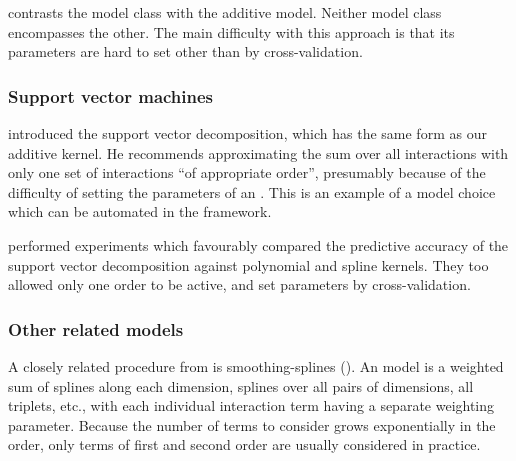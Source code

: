  contrasts the \HKL{} model class with the additive \gp{} model.
Neither model class encompasses the other.
The main difficulty with this approach is that its parameters are hard to set other than by cross-validation.



\subsubsection{Support vector machines}

\citet{vapnik1998statistical} introduced the support vector \ANOVA{} decomposition, which has the same form as our additive kernel.
He recommends approximating the sum over all interactions with only one set of interactions ``of appropriate order'', presumably because of the difficulty of setting the parameters of an \SVM{}.
This is an example of a model choice which can be automated in the \gp{} framework.

\citet{stitson1999support} performed experiments which favourably compared the predictive accuracy of the support vector \ANOVA{} decomposition against polynomial and spline kernels.
They too allowed only one order to be active, and set parameters by cross-validation.
%

\subsubsection{Other related models}

A closely related procedure from \citet{wahba1990spline} is smoothing-splines \ANOVA{} (\SSANOVA{}).
An \SSANOVA{} model is a weighted sum of splines along each dimension, splines over all pairs of dimensions, all triplets, etc., with each individual interaction term having a separate weighting parameter.
Because the number of terms to consider grows exponentially in the order, only terms of first and second order are usually considered in practice.



